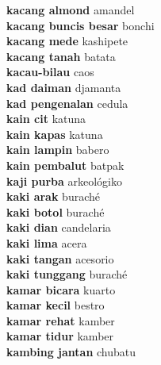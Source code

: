 \textbf{ kacang almond  } amandel \\
\textbf{ kacang buncis besar  } bonchi \\
\textbf{ kacang mede  } kashipete \\
\textbf{ kacang tanah  } batata \\
\textbf{ kacau-bilau  } caos \\
\textbf{ kad daiman  } djamanta \\
\textbf{ kad pengenalan  } cedula \\
\textbf{ kain cit  } katuna \\
\textbf{ kain kapas  } katuna \\
\textbf{ kain lampin  } babero \\
\textbf{ kain pembalut  } batpak \\
\textbf{ kaji purba  } arkeológiko \\
\textbf{ kaki arak  } buraché \\
\textbf{ kaki botol  } buraché \\
\textbf{ kaki dian  } candelaria \\
\textbf{ kaki lima  } acera \\
\textbf{ kaki tangan  } acesorio \\
\textbf{ kaki tunggang  } buraché \\
\textbf{ kamar bicara  } kuarto \\
\textbf{ kamar kecil  } bestro \\
\textbf{ kamar rehat  } kamber \\
\textbf{ kamar tidur  } kamber \\
\textbf{ kambing jantan  } chubatu \\
